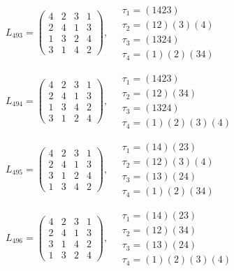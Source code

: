 $L_{493} = \begin{pmatrix} 4 & 2 & 3 & 1 \\ 2 & 4 & 1 & 3 \\ 1 & 3 & 2 & 4 \\ 3 & 1 & 4 & 2 \end{pmatrix}, \quad \begin{matrix} \tau_{1} = (1 4 2 3) \\ \tau_{2} = (1 2)(3)(4) \\ \tau_{3} = (1 3 2 4) \\ \tau_{4} = (1)(2)(3 4) \end{matrix}$

$L_{494} = \begin{pmatrix} 4 & 2 & 3 & 1 \\ 2 & 4 & 1 & 3 \\ 1 & 3 & 4 & 2 \\ 3 & 1 & 2 & 4 \end{pmatrix}, \quad \begin{matrix} \tau_{1} = (1 4 2 3) \\ \tau_{2} = (1 2)(3 4) \\ \tau_{3} = (1 3 2 4) \\ \tau_{4} = (1)(2)(3)(4) \end{matrix}$

$L_{495} = \begin{pmatrix} 4 & 2 & 3 & 1 \\ 2 & 4 & 1 & 3 \\ 3 & 1 & 2 & 4 \\ 1 & 3 & 4 & 2 \end{pmatrix}, \quad \begin{matrix} \tau_{1} = (1 4)(2 3) \\ \tau_{2} = (1 2)(3)(4) \\ \tau_{3} = (1 3)(2 4) \\ \tau_{4} = (1)(2)(3 4) \end{matrix}$

$L_{496} = \begin{pmatrix} 4 & 2 & 3 & 1 \\ 2 & 4 & 1 & 3 \\ 3 & 1 & 4 & 2 \\ 1 & 3 & 2 & 4 \end{pmatrix}, \quad \begin{matrix} \tau_{1} = (1 4)(2 3) \\ \tau_{2} = (1 2)(3 4) \\ \tau_{3} = (1 3)(2 4) \\ \tau_{4} = (1)(2)(3)(4) \end{matrix}$

